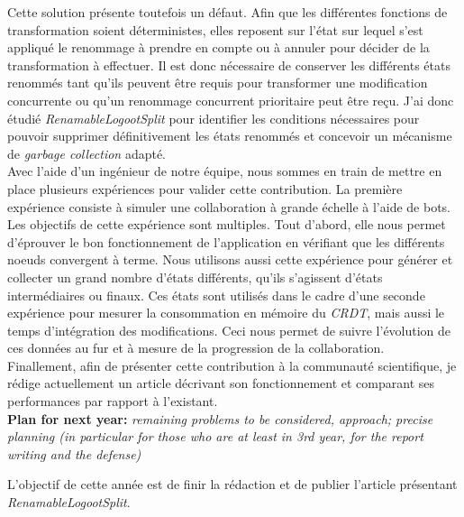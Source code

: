 \documentclass[12pt]{article}
\newcommand{\commentaire}[1]{\small\textit{#1}}
\begin{document}

Cette solution présente toutefois un défaut.
Afin que les différentes fonctions de transformation soient déterministes, elles reposent sur l'état sur lequel s'est appliqué le renommage à prendre en compte ou à annuler pour décider de la transformation à effectuer.
Il est donc nécessaire de conserver les différents états renommés tant qu'ils peuvent être requis pour transformer une modification concurrente ou qu'un renommage concurrent prioritaire peut être reçu.
J'ai donc étudié \emph{RenamableLogootSplit} pour identifier les conditions nécessaires pour pouvoir supprimer définitivement les états renommés et concevoir un mécanisme de \emph{garbage collection} adapté.
\\

Avec l'aide d'un ingénieur de notre équipe, nous sommes en train de mettre en place plusieurs expériences pour valider cette contribution.
La première expérience consiste à simuler une collaboration à grande échelle à l'aide de bots.
Les objectifs de cette expérience sont multiples.
Tout d'abord, elle nous permet d'éprouver le bon fonctionnement de l'application en vérifiant que les différents noeuds convergent à terme.
Nous utilisons aussi cette expérience pour générer et collecter un grand nombre d'états différents, qu'ils s'agissent d'états intermédiaires ou finaux.
Ces états sont utilisés dans le cadre d'une seconde expérience pour mesurer la consommation en mémoire du \emph{CRDT}, mais aussi le temps d'intégration des modifications.
Ceci nous permet de suivre l'évolution de ces données au fur et à mesure de la progression de la collaboration.
\\

Finallement, afin de présenter cette contribution à la communauté scientifique, je rédige actuellement un article décrivant son fonctionnement et comparant ses performances par rapport à l'existant.\\

\noindent\textbf{Plan for next year:}
\commentaire{%
  remaining problems to be considered, approach; precise planning (in
  particular for those who are at least in 3rd year, for the report
  writing and the defense)\\}

L'objectif de cette année est de finir la rédaction et de publier l'article présentant \emph{RenamableLogootSplit}.
\\
\end{document}
